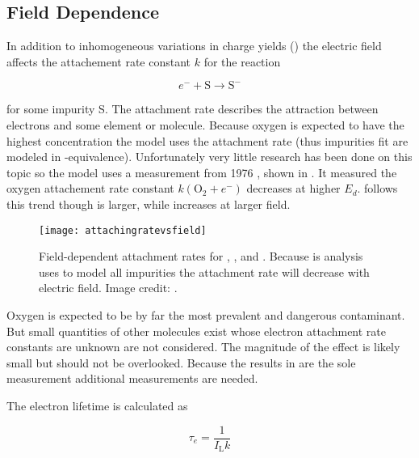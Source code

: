\subsection{Field Dependence}
\label{subsec:electron_lifetime_model_field}
In addition to inhomogeneous variations in charge yields () the electric field affects
the attachement rate constant $k$ for the reaction

\begin{equation}
e^- + \mathrm{S} \rightarrow \mathrm{S^-}
\end{equation}

\noindent for some impurity S.  The attachment rate describes the attraction between electrons and some element or molecule.  Because
oxygen is expected to have the highest concentration the model uses the  attachment rate (thus impurities fit are modeled
in -equivalence).  Unfortunately very little research has been done on this topic so the model uses a measurement from
1976 , shown in .  It measured the oxygen attachement rate
constant $k(\mathrm{O_2} + e^-)$ decreases at higher $E_d$.   follows this trend though is larger, while
 increases at larger field.

\begin{figure}
\centering
\texttt{[image: attachingratevsfield]}
\caption{Field-dependent attachment rates for , , and .  Because is analysis uses  to model all
impurities the attachment rate will decrease with electric field.  Image credit: .}
\label{fig:electron_lifetime_model_field_attaching_rate}
\end{figure}

Oxygen is expected to be by far the most prevalent and dangerous contaminant.  But small
quantities of other molecules exist whose electron attachment rate constants are unknown are not considered.  The magnitude of the effect
is likely small but should not be overlooked.  Because the results in  are
the sole measurement additional measurements are needed.

The electron lifetime is calculated as

\begin{equation}
\tau_e = \frac{1}{I_{\mathrm{L}} k}
\label{eq:electron_lifetime_model_field_lifetime}
\end{equation}

